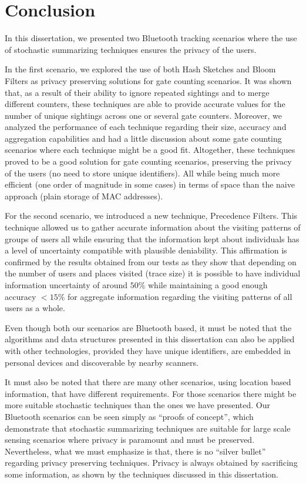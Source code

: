 \chapter{Conclusion}
\label{cha:conclusion}

In this dissertation, we presented two Bluetooth tracking scenarios
where the use of stochastic summarizing techniques ensures the privacy
of the users.

In the first scenario, we explored the use of both Hash Sketches and
Bloom Filters as privacy preserving solutions for gate counting
scenarios.  It was shown that, as a result of their ability to ignore
repeated sightings and to merge different counters, these techniques
are able to provide accurate values for the number of unique sightings
across one or several gate counters.  Moreover, we analyzed the
performance of each technique regarding their size, accuracy and
aggregation capabilities and had a little discussion about some gate
counting scenarios where each technique might be a good
fit. Altogether, these techniques proved to be a good solution for gate
counting scenarios, preserving the privacy of the users (no need to
store unique identifiers). All while being much more efficient (one
order of magnitude in some cases) in terms of space than the naive
approach (plain storage of MAC addresses).


For the second scenario, we introduced a new technique, Precedence
Filters. This technique allowed us to gather accurate information
about the visiting patterns of groups of users all while ensuring that
the information kept about individuals has a level of uncertainty
compatible with plausible deniability.  This affirmation is confirmed
by the results obtained from our tests as they show that depending on
the number of users and places visited (trace size) it is possible to
have individual information uncertainty of around $50\%$ while
maintaining a good enough accuracy $  <15\%$ for aggregate information
regarding the visiting patterns of all users as a whole.


Even though both our scenarios are Bluetooth based, it must be noted
that the algorithms and data structures presented in this dissertation
can also be applied with other technologies, provided they have unique
identifiers, are embedded in personal devices and discoverable by
nearby scanners.

It must also be noted that there are many other scenarios, using
location based information, that have different requirements. For
those scenarios there might be more suitable stochastic techniques
than the ones we have presented. Our Bluetooth scenarios can be seen
simply as ``proofs of concept'', which demonstrate that stochastic
summarizing techniques are suitable for large scale sensing scenarios
where privacy is paramount and must be preserved. Nevertheless, what
we must emphasize is that, there is no ``silver bullet'' regarding
privacy preserving techniques. Privacy is always obtained by
sacrificing some information, as shown by the techniques
discussed in this dissertation.

